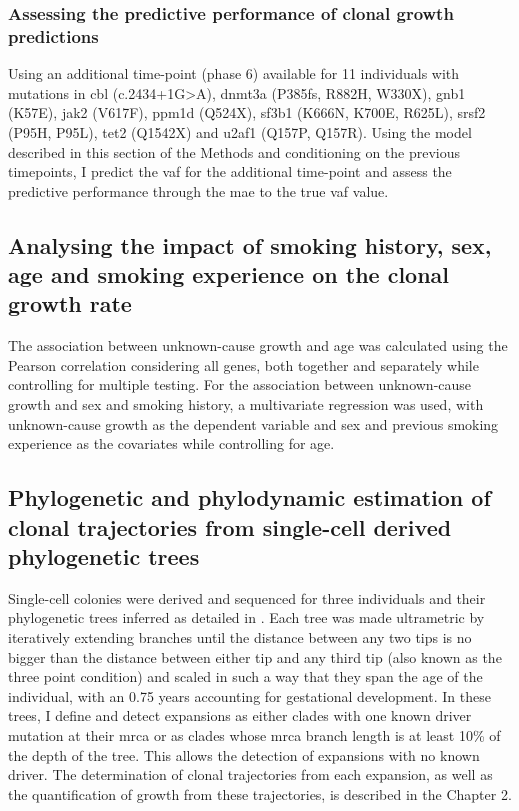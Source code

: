 \subsubsection{Assessing the predictive performance of clonal growth predictions}
Using an additional time-point (phase 6) available for 11 individuals with mutations in \ac{cbl} (c.2434+1G>A), \ac{dnmt3a} (P385fs, R882H, W330X), \ac{gnb1} (K57E), \ac{jak2} (V617F), \ac{ppm1d} (Q524X), \ac{sf3b1} (K666N, K700E, R625L), \ac{srsf2} (P95H, P95L), \ac{tet2} (Q1542X) and \ac{u2af1} (Q157P, Q157R). Using the model described in this section of the Methods and conditioning on the previous timepoints, I predict the \ac{vaf} for the additional time-point and assess the predictive performance through the \ac{mae} to the true \ac{vaf} value.

\subsection{Analysing the impact of smoking history, sex, age and smoking experience on the clonal growth rate}

The association between unknown-cause growth and age was calculated using the Pearson correlation considering all genes, both together and separately while controlling for multiple testing. For the association between unknown-cause growth and sex and smoking history, a multivariate regression was used, with unknown-cause growth as the dependent variable and sex and previous smoking experience as the covariates while controlling for age.

\subsection{Phylogenetic and phylodynamic estimation of clonal trajectories from single-cell derived phylogenetic trees}

Single-cell colonies were derived and sequenced for three individuals and their phylogenetic trees inferred as detailed in \cite{Fabre2021-uw}. Each tree was made ultrametric by iteratively extending branches until the distance between any two tips is no bigger than the distance between either tip and any third tip (also known as the three point condition) and scaled in such a way that they span the age of the individual, with an 0.75 years accounting for gestational development. In these trees, I define and detect expansions as either clades with one known driver mutation at their \ac{mrca} or as clades whose \ac{mrca} branch length is at least 10\% of the depth of the tree. This allows the detection of expansions with no known driver. The determination of clonal trajectories from each expansion, as well as the quantification of growth from these trajectories, is described in the Chapter 2.

